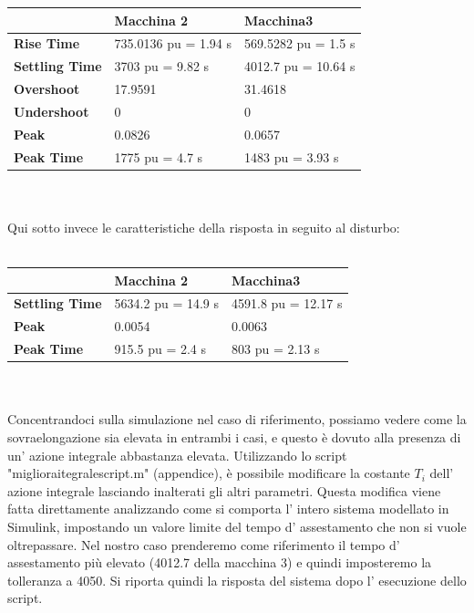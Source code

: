 \documentclass[Lau,noexaminfo]{sapthesis}
\begin{document}
	\begin{tabular}{|l|l|l|}
		\hline
		& \textbf{Macchina 2}	& \textbf{Macchina3}\\
		\hline
		\textbf{Rise Time} & 735.0136 pu = 1.94 s & 569.5282 pu = 1.5 s\\
		\textbf{Settling Time} & 3703 pu = 9.82 s & 4012.7 pu = 10.64 s\\
		\textbf{Overshoot} & 17.9591 & 31.4618\\
		\textbf{Undershoot} & 0 & 0\\
		\textbf{Peak} & 0.0826 & 0.0657\\
		\textbf{Peak Time} & 1775 pu = 4.7 s & 1483 pu = 3.93 s\\
		\hline	\end{tabular}\\\\
	Qui sotto invece le caratteristiche della risposta in seguito al disturbo:\\\\
	\begin{tabular}{|l|l|l|}
		\hline
		& \textbf{Macchina 2}	& \textbf{Macchina3}\\
		\hline
		\textbf{Settling Time} & 5634.2 pu = 14.9 s & 4591.8 pu = 12.17 s\\
		\textbf{Peak} & 0.0054 & 0.0063\\
		\textbf{Peak Time} & 915.5 pu = 2.4 s & 803 pu = 2.13 s\\
		\hline
	\end{tabular}\\\\
	Concentrandoci sulla simulazione nel caso di riferimento, possiamo vedere come la sovraelongazione sia elevata in entrambi i casi, e questo è dovuto alla presenza di un' azione integrale abbastanza elevata. Utilizzando lo script "migliora\textunderscore itegrale\textunderscore script.m" (appendice), è possibile modificare la costante $T_i$ dell' azione integrale lasciando inalterati gli altri parametri. Questa modifica viene fatta direttamente analizzando come si comporta l' intero sistema modellato in Simulink, impostando un valore limite del tempo d' assestamento che non si vuole oltrepassare. Nel nostro caso prenderemo come riferimento il tempo d' assestamento più elevato (4012.7 della macchina 3) e quindi imposteremo la tolleranza a 4050. Si riporta quindi la risposta del sistema dopo l' esecuzione dello script.
\end{document}
